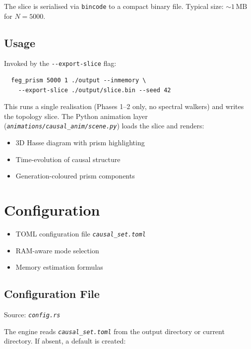 \documentclass[11pt, a4paper, openany]{book}
\newcommand{\code}[1]{\texttt{#1}}
\newcommand{\flag}[1]{\texttt{-{}-#1}}
\newcommand{\file}[1]{\texttt{\itshape #1}}
\newenvironment{introduction}[1][Chapter Overview]{%
  \begin{tcolorbox}[
    enhanced,colback=structure!5,colframe=structure,
    colbacktitle=structure,coltitle=white,
    fonttitle=\small\bfseries,title={#1},
    arc=2pt,boxrule=0.7pt,
    left=8pt,right=8pt,top=6pt,bottom=6pt,
    before skip=12pt,after skip=12pt
  ]\itshape\begin{itemize}[leftmargin=*,itemsep=2pt,parsep=0pt]
}{%
  \end{itemize}\end{tcolorbox}
}
\begin{document}
The slice is serialised via \code{bincode} to a compact binary file.  Typical
size: $\sim 1\,\text{MB}$ for $N = 5000$.

\section{Usage}

Invoked by the \flag{export-slice} flag:

\begin{verbatim}
  feg_prism 5000 1 ./output --inmemory \
    --export-slice ./output/slice.bin --seed 42
\end{verbatim}

This runs a single realisation (Phases 1--2 only, no spectral walkers) and
writes the topology slice.  The Python animation layer
(\file{animations/causal\_anim/scene.py}) loads the slice and renders:

\begin{itemize}
  \item 3D Hasse diagram with prism highlighting
  \item Time-evolution of causal structure
  \item Generation-coloured prism components
\end{itemize}


\chapter{Configuration}

\begin{introduction}
  \item TOML configuration file \file{causal\_set.toml}
  \item RAM-aware mode selection
  \item Memory estimation formulas
\end{introduction}

\section{Configuration File}

Source: \file{config.rs}

The engine reads \file{causal\_set.toml} from the output directory or current
directory.  If absent, a default is created:
\end{document}
